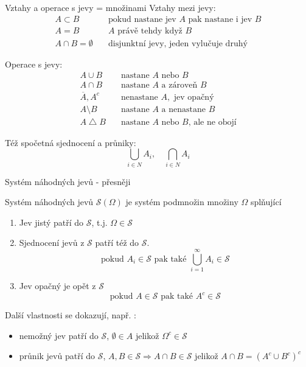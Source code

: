 \documentclass[smaller]{beamer}
\def\impl{\Rightarrow}
\def\blue#1{{\usebeamercolor[fg]{my blue} #1}}
\begin{document}
\begin{frame}{Vztahy a operace s jevy = množinami}
Vztahy mezi jevy:
\begin{align*}
 A\subset B&\quad\text{pokud nastane jev  $A$ pak nastane i jev $B$}\\
 A = B  &\quad\text{$A$ právě tehdy když $B$}\\
 A\cap B =\emptyset&\quad\text{disjunktní jevy, jeden vylučuje druhý}
\end{align*} 

Operace s jevy:
\begin{align*}
 A\cup B  &\quad\text{nastane $A$ nebo $B$}\\
 A\cap B  &\quad\text{nastane $A$ a zároveň $B$}\\
 \overline{A}, A^c &\quad\text{nenastane $A$},\text{ jev opačný}\\
 A\setminus B &\quad\text{nastane $A$ a nenastane $B$}\\
 A\bigtriangleup B &\quad\text{nastane $A$ nebo $B$, ale ne obojí}
\end{align*}

Též spočetná sjednocení a průniky:
\[
  \bigcup_{i\in N} A_i,\quad \bigcap_{i\in N} A_i
\]
\end{frame}


\begin{frame}{Systém náhodných jevů - přesněji}

\begin{definition}
Systém náhodných jevů $\mathcal{S}(\Omega)$ je systém podmnožin množiny $\Omega$ splňující
\begin{enumerate}
\item 
\blue{Jev jistý} patří do 
$\mathcal{S}$, t.j. $\Omega \in \mathcal{S}$

\item
Sjednocení jevů z $\mathcal S$ patří též do $\mathcal S$.
\[
\text{pokud } A_i\in \mathcal{S} \text{ pak také } \bigcup_{i=1}^{\infty} A_i \in \mathcal{S}
\]
%
\item Jev opačný je opět z $\mathcal S$
\[
\text{pokud } A \in \mathcal{S} \text{ pak také } A^c \in \mathcal{S}
\]
\end{enumerate}
\end{definition}

Další vlastnosti se dokazují, např. :
\begin{itemize}
 \item nemožný jev patří do $\mathcal S$, $\emptyset \in A$ jelikož $\Omega^c \in \mathcal{S}$
 \item průnik jevů patří do $\mathcal S$, $A, B \in \mathcal{S} \impl A\cap B \in \mathcal{S}$ jelikož $A\cap B = (A^c \cup B^c)^c$
\end{itemize}
\end{frame}
\end{document}
